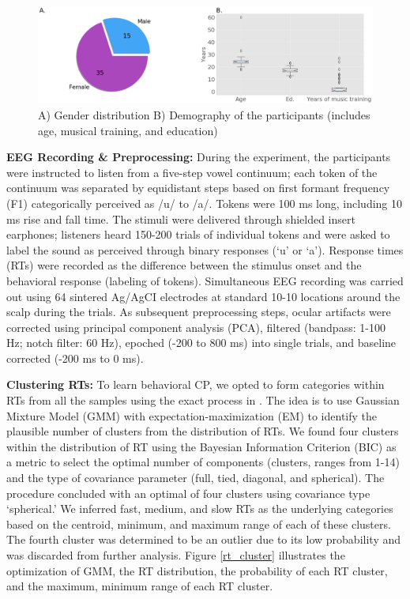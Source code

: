 \documentclass{article}
\begin{document}
\begin{figure}[ht]
\vskip 0.2in
\begin{center}
\centerline{\includegraphics[width=\columnwidth]{Images/demograph}}
\caption[Demographic Information]{A) Gender distribution B) Demography of the participants (includes age, musical training, and education)}
\label{topomap_gen}
\end{center}
\vskip -0.2in
\end{figure}

\textbf{EEG Recording \& Preprocessing:} During the experiment, the participants were instructed to listen from a five-step vowel continuum; each token of the continuum was separated by equidistant steps based on first formant frequency (F1) categorically perceived as /u/ to /a/. Tokens were 100 ms long, including 10 ms rise and fall time. The stimuli were delivered through shielded insert earphones; listeners heard 150-200 trials of individual tokens and were asked to label the sound as perceived through binary responses (‘u’ or ‘a’). Response times (RTs) were recorded as the difference between the stimulus onset and the behavioral response (labeling of tokens). Simultaneous EEG recording was carried out using 64 sintered Ag/AgCI electrodes at standard 10-10 locations around the scalp during the trials. As subsequent preprocessing steps, ocular artifacts were corrected using principal component analysis (PCA), filtered (bandpass: 1-100 Hz; notch filter: 60 Hz), epoched (-200 to 800 ms) into single trials, and baseline corrected (-200 ms to 0 ms).

\textbf{Clustering RTs:} To learn behavioral CP, we opted to form categories within RTs from all the samples using the exact process in \cite{Al_Fahad_2020}. The idea is to use Gaussian Mixture Model (GMM) with expectation-maximization (EM) to identify the plausible number of clusters from the distribution of RTs. We found four clusters within the distribution of RT using the Bayesian Information Criterion (BIC) as a metric to select the optimal number of components (clusters, ranges from 1-14) and the type of covariance parameter (full, tied, diagonal, and spherical). The procedure concluded with an optimal of four clusters using covariance type ‘spherical.’ We inferred fast, medium, and slow RTs as the underlying categories based on the centroid, minimum, and maximum range of each of these clusters. The fourth cluster was determined to be an outlier due to its low probability and was discarded from further analysis. Figure \ref{rt_cluster} illustrates the optimization of GMM, the RT distribution, the probability of each RT cluster, and the maximum, minimum range of each RT cluster.
\end{document}
